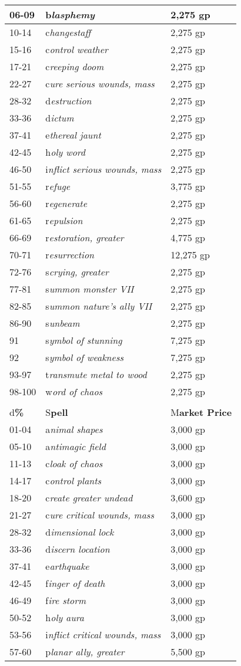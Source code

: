 \documentclass{article}
\begin{document}
\begin{tabular}{|>{\raggedright}p{29pt}|>{\raggedright}p{138pt}|>{\raggedright}p{147pt}|}
\hline
06-09 & b\textit{lasphemy} & 2,275 gp\tabularnewline
\hline
10-14 & c\textit{hangestaff} & 2,275 gp\tabularnewline
\hline
15-16 & c\textit{ontrol weather} & 2,275 gp\tabularnewline
\hline
17-21 & c\textit{reeping doom} & 2,275 gp\tabularnewline
\hline
22-27 & c\textit{ure serious wounds, mass} & 2,275 gp\tabularnewline
\hline
28-32 & d\textit{estruction} & 2,275 gp\tabularnewline
\hline
33-36 & d\textit{ictum} & 2,275 gp\tabularnewline
\hline
37-41 & e\textit{thereal jaunt} & 2,275 gp\tabularnewline
\hline
42-45 & h\textit{oly word} & 2,275 gp\tabularnewline
\hline
46-50 & i\textit{nflict serious wounds, mass} & 2,275 gp\tabularnewline
\hline
51-55 & r\textit{efuge} & 3,775 gp\tabularnewline
\hline
56-60 & r\textit{egenerate} & 2,275 gp\tabularnewline
\hline
61-65 & r\textit{epulsion} & 2,275 gp\tabularnewline
\hline
66-69 & r\textit{estoration, greater} & 4,775 gp\tabularnewline
\hline
70-71 & r\textit{esurrection} & 12,275 gp\tabularnewline
\hline
72-76 & s\textit{crying, greater} & 2,275 gp\tabularnewline
\hline
77-81 & s\textit{ummon monster VII} & 2,275 gp\tabularnewline
\hline
82-85 & s\textit{ummon nature's ally VII} & 2,275 gp\tabularnewline
\hline
86-90 & s\textit{unbeam} & 2,275 gp\tabularnewline
\hline
91 & s\textit{ymbol of stunning} & 7,275 gp\tabularnewline
\hline
92 & s\textit{ymbol of weakness} & 7,275 gp\tabularnewline
\hline
93-97 & t\textit{ransmute metal to wood} & 2,275 gp\tabularnewline
\hline
98-100 & w\textit{ord of chaos} & 2,275 gp\tabularnewline
\hline
\multicolumn{3}{|p{314pt}|}{8\textit{\textbf{th-Level Divine Spells}}}\tabularnewline
\hline
d\textbf{\%} & S\textbf{pell} & M\textbf{arket Price}\tabularnewline
\hline
01-04 & a\textit{nimal shapes} & 3,000 gp\tabularnewline
\hline
05-10 & a\textit{ntimagic field} & 3,000 gp\tabularnewline
\hline
11-13 & c\textit{loak of chaos} & 3,000 gp\tabularnewline
\hline
14-17 & c\textit{ontrol plants} & 3,000 gp\tabularnewline
\hline
18-20 & c\textit{reate greater undead} & 3,600 gp\tabularnewline
\hline
21-27 & c\textit{ure critical wounds, mass} & 3,000 gp\tabularnewline
\hline
28-32 & d\textit{imensional lock} & 3,000 gp\tabularnewline
\hline
33-36 & d\textit{iscern location} & 3,000 gp\tabularnewline
\hline
37-41 & e\textit{arthquake} & 3,000 gp\tabularnewline
\hline
42-45 & f\textit{inger of death} & 3,000 gp\tabularnewline
\hline
46-49 & f\textit{ire storm} & 3,000 gp\tabularnewline
\hline
50-52 & h\textit{oly aura} & 3,000 gp\tabularnewline
\hline
53-56 & i\textit{nflict critical wounds, mass} & 3,000 gp\tabularnewline
\hline
57-60 & p\textit{lanar ally, greater} & 5,500 gp\tabularnewline

\end{tabular}
\end{document}
